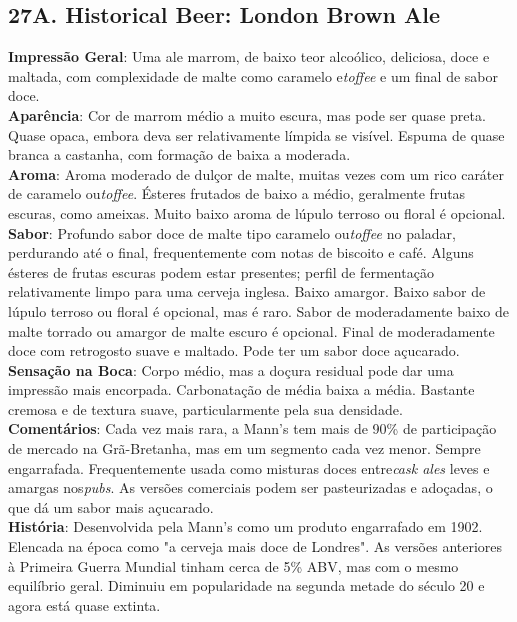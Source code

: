 \subsection*{27A. Historical Beer: London Brown Ale}
\textbf{Impressão Geral}: Uma ale marrom, de baixo teor alcoólico, deliciosa, doce e maltada, com complexidade de malte como caramelo e\textit{toffee} e um final de sabor doce. \\
\textbf{Aparência}: Cor de marrom médio a muito escura, mas pode ser quase preta. Quase opaca, embora deva ser relativamente límpida se visível. Espuma de quase branca a castanha, com formação de baixa a moderada. \\
\textbf{Aroma}: Aroma moderado de dulçor de malte, muitas vezes com um rico caráter de caramelo ou\textit{toffee}. Ésteres frutados de baixo a médio, geralmente frutas escuras, como ameixas. Muito baixo aroma de lúpulo terroso ou floral é opcional. \\
\textbf{Sabor}: Profundo sabor doce de malte tipo caramelo ou\textit{toffee} no paladar, perdurando até o final, frequentemente com notas de biscoito e café. Alguns ésteres de frutas escuras podem estar presentes; perfil de fermentação relativamente limpo para uma cerveja inglesa. Baixo amargor. Baixo sabor de lúpulo terroso ou floral é opcional, mas é raro. Sabor de moderadamente baixo de malte torrado ou amargor de malte escuro é opcional. Final de moderadamente doce com retrogosto suave e maltado. Pode ter um sabor doce açucarado. \\
\textbf{Sensação na Boca}: Corpo médio, mas a doçura residual pode dar uma impressão mais encorpada. Carbonatação de média baixa a média. Bastante cremosa e de textura suave, particularmente pela sua densidade. \\
\textbf{Comentários}: Cada vez mais rara, a Mann's tem mais de 90\% de participação de mercado na Grã-Bretanha, mas em um segmento cada vez menor. Sempre engarrafada. Frequentemente usada como misturas doces entre\textit{cask ales} leves e amargas nos\textit{pubs}. As versões comerciais podem ser pasteurizadas e adoçadas, o que dá um sabor mais açucarado. \\
\textbf{História}: Desenvolvida pela Mann's como um produto engarrafado em 1902. Elencada na época como "a cerveja mais doce de Londres". As versões anteriores à Primeira Guerra Mundial tinham cerca de 5\% ABV, mas com o mesmo equilíbrio geral. Diminuiu em popularidade na segunda metade do século 20 e agora está quase extinta. \\
